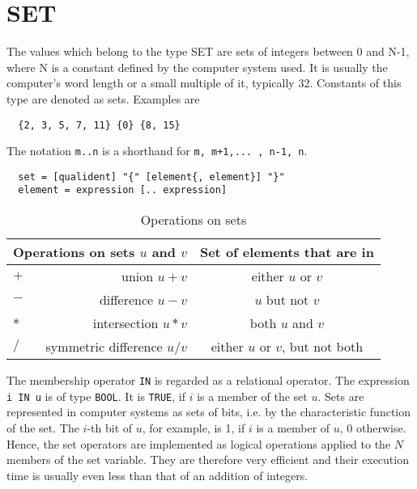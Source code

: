\section{SET}
The values which belong to the type SET are sets of integers between 0 and N-1, where N is a
constant defined by the computer system used. It is usually the computer's word length or a small
multiple of it, typically 32. Constants of this type are denoted as sets. Examples are
\begin{verbatim}
  {2, 3, 5, 7, 11} {0} {8, 15}
\end{verbatim}
The notation \verb|m..n| is a shorthand for \verb|m, m+1,... , n-1, n|.
\begin{verbatim}
  set = [qualident] "{" [element{, element}] "}"
  element = expression [.. expression]
\end{verbatim}
\begin{table}[h!]
  \centering
  \begin{tabular}{l r|c}
    \multicolumn{2}{r|}{Operations on sets $u$ and $v$} & Set of elements that are in\\\hline
    $+$ &                union $u+v$ & either $u$ or $v$ \\
    $-$ &           difference $u-v$ &   $u$ but not $v$ \\
    $*$ &         intersection $u*v$ &  both $u$ and $v$ \\
    $/$ & symmetric difference $u/v$ & either $u$ or $v$, but not both
  \end{tabular}
  \caption{Operations on sets}
\end{table}
The membership operator \verb|IN| is regarded as a relational operator. The expression \verb|i IN u|
is of type \verb|BOOL|. It is \verb|TRUE|, if $i$ is a member of the set $u$. Sets are represented in
computer systems as sets of bits, i.e. by the characteristic function of the set. The $i$-th bit of $u$,
for example, is 1, if $i$ is a member of $u$, 0 otherwise. Hence, the set operators are implemented as
logical operations applied to the $N$ members of the set variable. They are therefore very efficient and
their execution time is usually even less than that of an addition of integers.
